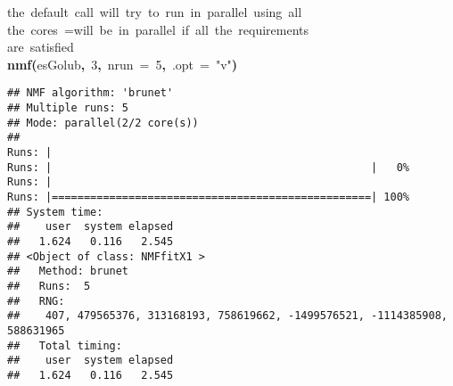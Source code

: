 \documentclass[a4paper]{article}\usepackage{graphicx, color}
\makeatletter
\newcommand{\hlnumber}[1]{\textcolor[rgb]{0,0,0}{#1}}%
\newcommand{\hlfunctioncall}[1]{\textcolor[rgb]{0.501960784313725,0,0.329411764705882}{\textbf{#1}}}%
\newcommand{\hlstring}[1]{\textcolor[rgb]{0.6,0.6,1}{#1}}%
\newcommand{\hlkeyword}[1]{\textcolor[rgb]{0,0,0}{\textbf{#1}}}%
\newcommand{\hlargument}[1]{\textcolor[rgb]{0.690196078431373,0.250980392156863,0.0196078431372549}{#1}}%
\newcommand{\hlcomment}[1]{\textcolor[rgb]{0.180392156862745,0.6,0.341176470588235}{#1}}%
\newcommand{\hlsymbol}[1]{\textcolor[rgb]{0,0,0}{#1}}%
\newcommand{\hlstd}[1]{\textcolor[rgb]{0,0,0}{#1}}%
\newenvironment{kframe}{%
 \def\FrameCommand##1{\hskip\@totalleftmargin \hskip-\fboxsep
 \colorbox{shadecolor}{##1}\hskip-\fboxsep
     \hskip-\linewidth \hskip-\@totalleftmargin \hskip\columnwidth}%
 \MakeFramed {\advance\hsize-\width
   \@totalleftmargin\z@ \linewidth\hsize
   \@setminipage}}%
 {\par\unskip\endMakeFramed}
\newenvironment{knitrout}{}{} %
\makeatother
\begin{document}
\begin{knitrout}
\color{fgcolor}\begin{kframe}
\begin{flushleft}
\ttfamily\noindent
\hlcomment{\usebox{\hlnormalsizeboxhash}{\ }the{\ }default{\ }call{\ }will{\ }try{\ }to{\ }run{\ }in{\ }parallel{\ }using{\ }all}\hspace*{\fill}\\
\hlstd{}\hlcomment{\usebox{\hlnormalsizeboxhash}{\ }the{\ }cores{\ }=\usebox{\hlnormalsizeboxgreaterthan}{\ }will{\ }be{\ }in{\ }parallel{\ }if{\ }all{\ }the{\ }requirements}\hspace*{\fill}\\
\hlstd{}\hlcomment{\usebox{\hlnormalsizeboxhash}{\ }are{\ }satisfied}\hspace*{\fill}\\
\hlstd{}\hlfunctioncall{nmf}\hlkeyword{(}\hlsymbol{esGolub}\hlkeyword{,}{\ }\hlnumber{3}\hlkeyword{,}{\ }\hlargument{nrun}{\ }\hlargument{=}{\ }\hlnumber{5}\hlkeyword{,}{\ }\hlargument{.opt}{\ }\hlargument{=}{\ }\hlstring{"{}v"{}}\hlkeyword{)}\mbox{}
\normalfont
\end{flushleft}
\begin{verbatim}
## NMF algorithm: 'brunet'
## Multiple runs: 5
## Mode: parallel(2/2 core(s))
## 
Runs: |                                                        
Runs: |                                                  |   0%
Runs: |                                                        
Runs: |==================================================| 100%
## System time:
##    user  system elapsed 
##   1.624   0.116   2.545 
## <Object of class: NMFfitX1 >
##   Method: brunet 
##   Runs:  5 
##   RNG:
##    407, 479565376, 313168193, 758619662, -1499576521, -1114385908, 588631965 
##   Total timing:
##    user  system elapsed 
##   1.624   0.116   2.545 
\end{verbatim}
\end{kframe}
\end{knitrout}
\end{document}
